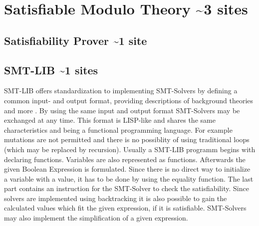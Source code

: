 \section{Satisfiable Modulo Theory \textasciitilde 3 sites}
\subsection{Satisfiability Prover \textasciitilde 1 site}
\subsection{SMT-LIB \textasciitilde 1 sites}
SMT-LIB offers standardization to implementing SMT-Solvers by defining a common input- and output format, providing descriptions of background theories and more \cite{cokSMTLIBv2LanguageTools}. %
By using the same input and output format SMT-Solvers may be exchanged at any time. 
This format is LISP-like and shares the same characteristics and being a functional programming language. 
For example mutations are not permitted and there is no possiblity of using traditional loops (which may be replaced by recursion).
Usually a SMT-LIB programm begins with declaring functions. Variables are also represented as functions. 
Afterwards the given Boolean Expression is formulated. Since there is no direct way to initialize a variable with a value, it has to be done by using the equality function. 
The last part contains an instruction for the SMT-Solver to check the satisfiability. 
Since solvers are implemented using backtracking it is also possible to gain the calculated values which fit the given expression, if it is satisfiable. 
SMT-Solvers may also implement the simplification of a given expression.